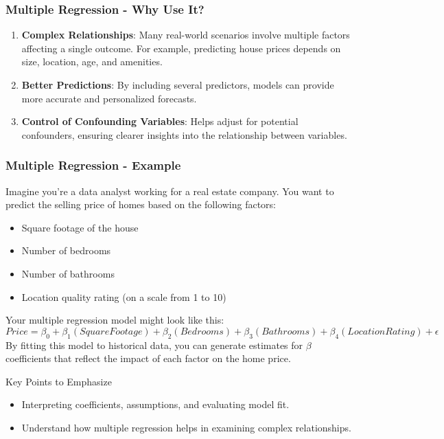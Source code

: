 \documentclass{beamer}
\begin{document}
\begin{frame}[fragile]
    \frametitle{Multiple Regression - Why Use It?}
    \begin{enumerate}
        \item \textbf{Complex Relationships}: Many real-world scenarios involve multiple factors affecting a single outcome. For example, predicting house prices depends on size, location, age, and amenities.
        
        \item \textbf{Better Predictions}: By including several predictors, models can provide more accurate and personalized forecasts.
        
        \item \textbf{Control of Confounding Variables}: Helps adjust for potential confounders, ensuring clearer insights into the relationship between variables.
    \end{enumerate}
\end{frame}

\begin{frame}[fragile]
    \frametitle{Multiple Regression - Example}
    Imagine you're a data analyst working for a real estate company. You want to predict the selling price of homes based on the following factors:
    \begin{itemize}
        \item Square footage of the house
        \item Number of bedrooms
        \item Number of bathrooms
        \item Location quality rating (on a scale from 1 to 10)
    \end{itemize}

    Your multiple regression model might look like this:
    \[
    Price = \beta_0 + \beta_1(SquareFootage) + \beta_2(Bedrooms) + \beta_3(Bathrooms) + \beta_4(LocationRating) + \epsilon
    \]
    By fitting this model to historical data, you can generate estimates for \(\beta\) coefficients that reflect the impact of each factor on the home price.

    \begin{block}{Key Points to Emphasize}
        \begin{itemize}
            \item Interpreting coefficients, assumptions, and evaluating model fit.
            \item Understand how multiple regression helps in examining complex relationships.
        \end{itemize}
    \end{block}
\end{frame}
\end{document}
